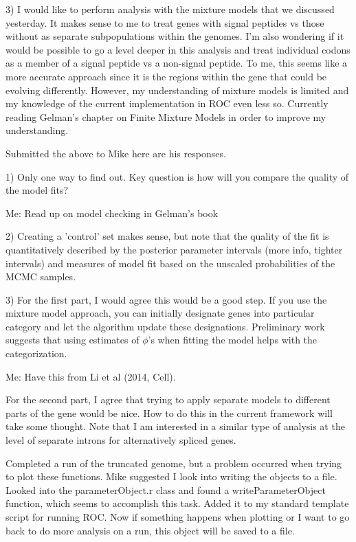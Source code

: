 \documentclass[11pt]{labbook}
\begin{document}
3) I would like to perform analysis with the mixture models that we discussed yesterday. It makes sense to me to treat genes with signal peptides vs those without as separate subpopulations within the genomes. I'm also wondering if it would be possible to go a level deeper in this analysis and treat individual codons as a member of a signal peptide vs a non-signal peptide. To me, this seems like a more accurate approach since it is the regions within the gene that could be evolving differently. However, my understanding of mixture models is limited and my knowledge of the current implementation in ROC even less so. Currently reading Gelman's chapter on Finite Mixture Models in order to improve my understanding. 

Submitted the above to Mike here are his responses.

1) Only one way to find out.  Key question is how will you compare the quality of the model fits? 

Me: Read up on model checking in Gelman's book

2) Creating a 'control' set makes sense, but note that the quality of the fit is quantitatively described by the  posterior parameter intervals (more info, tighter intervals) and measures of model fit based on the unscaled probabilities of the MCMC samples.

3) For the first part, I would agree this would be a good step. If you use the mixture model approach, you can initially designate genes into particular category and let the algorithm update these designations.  Preliminary work 
suggests that using estimates of $\phi$'s when fitting the model helps with the categorization.

Me: Have this from Li et al (2014, Cell). 

For the second part, I agree that trying to apply separate models to different parts of the gene would be nice.  How to do this in the current framework will take some thought.  Note that I am interested in a similar type of analysis at the level of separate introns for alternatively spliced 
genes. 

Completed a run of the truncated genome, but a problem occurred when trying to plot these functions. Mike suggested I look into writing the objects to a file. Looked into the parameterObject.r class and found a writeParameterObject function, which seems to accomplish this task. Added it to my standard template script for running ROC. Now if something happens when plotting or I want to go back to do more analysis on a run, this object will be saved to a file. 
\end{document}
